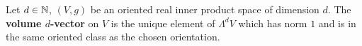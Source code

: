 \begin{definition}
  Let
    $d \in \mathbb{N}$,
    $(V, g)$ be an oriented real inner product space of dimension $d$.
  The \textbf{volume $d$-vector} on $V$ is the unique element of $\Lambda^d V$
  which has norm $1$ and is in the same oriented class as the chosen
  orientation.
\end{definition}
